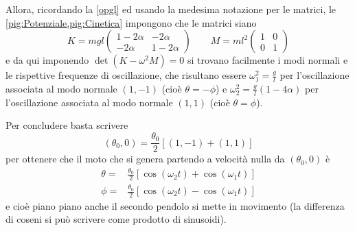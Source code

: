 \documentclass[../main.tex]{subfiles}
\begin{document}
Allora, ricordando la \cref{opgl} ed usando la medesima notazione per le matrici, le \cref{pig:Potenziale,pig:Cinetica} impongono che le matrici siano
\begin{equation*}
	K=mgl\begin{pmatrix}
		1-2\alpha & -2\alpha \\
		-2\alpha & 1-2\alpha
	\end{pmatrix} \qquad	
	M=ml^2\begin{pmatrix}
		1 & 0 \\
		0 & 1
	\end{pmatrix} 
\end{equation*}
e da qui imponendo $\det\left(K-\omega^2M\right)=0$ si trovano facilmente i modi normali e le rispettive frequenze di oscillazione, che risultano essere $\omega_1^2=\frac{g}{l}$ per l'oscillazione associata al modo normale $(1,-1)$ (cioè $\theta=-\phi$) e $\omega_2^2=\frac{g}{l}(1-4\alpha)$ per l'oscillazione associata al modo normale $(1,1)$ (cioè $\theta=\phi$).

Per concludere basta scrivere
\begin{equation*}
	(\theta_0,0)=\frac{\theta_0}2\left[(1,-1)+(1,1)\right]
\end{equation*}
per ottenere che il moto che si genera partendo a velocità nulla da $(\theta_0,0)$ è
\begin{align*}
	\theta=&\frac{\theta_0}2\left[\cos(\omega_2t)+\cos(\omega_1t)\right] \\
	\phi=&\frac{\theta_0}2\left[\cos(\omega_2t)-\cos(\omega_1t)\right]
\end{align*}
e cioè piano piano anche il secondo pendolo si mette in movimento (la differenza di coseni si può scrivere come prodotto di sinusoidi).
\end{document}
